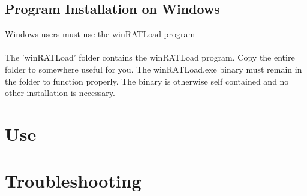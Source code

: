 \documentclass[titlepage]{article}
\begin{document}
\subsection{Program Installation on Windows}
Windows users must use the winRATLoad program\\\\
The 'winRATLoad' folder contains the winRATLoad program. Copy the entire folder to somewhere useful for you. The winRATLoad.exe binary must remain in the folder to function properly. The binary is otherwise self contained and no other installation is necessary.


\section{Use}
\section{Troubleshooting}
\end{document}
